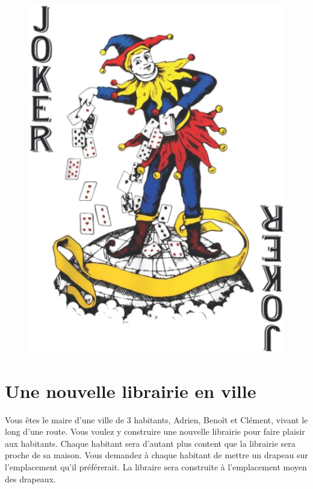 \documentclass[a4paper,10pt,oneside]{article}
\begin{document}
\vspace{3cm}
\begin{figure}[!ht]
  \centering
  \includegraphics[height=0.5\textheight]{figures/traders.jpg}
  \caption*{}
\end{figure}



\section{Une nouvelle librairie en ville}


Vous êtes le maire d'une ville de 3 habitants, Adrien, Benoît et Clément,  vivant le long d'une route.
Vous voulez y construire une nouvelle librairie pour faire plaisir aux habitants.
Chaque habitant sera d'autant plus content que la librairie sera proche de sa maison. 
Vous demandez à chaque habitant de mettre un drapeau sur l'emplacement qu'il préférerait.
La libraire sera construite à l'emplacement moyen des drapeaux.
\end{document}
